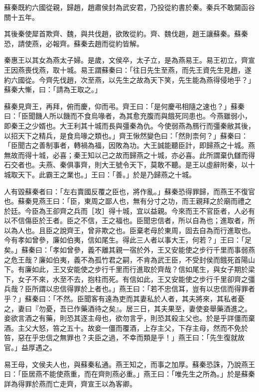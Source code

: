 \begin{pinyinscope}
蘇秦既約六國從親，歸趙，趙肅侯封為武安君，乃投從約書於秦。秦兵不敢闚函谷關十五年。

其後秦使犀首欺齊、魏，與共伐趙，欲敗從約。齊、魏伐趙，趙王讓蘇秦。蘇秦恐，請使燕，必報齊。蘇秦去趙而從約皆解。

秦惠王以其女為燕太子婦。是歲，文侯卒，太子立，是為燕易王。易王初立，齊宣王因燕喪伐燕，取十城。易王謂蘇秦曰：「往日先生至燕，而先王資先生見趙，遂約六國從。今齊先伐趙，次至燕，以先生之故為天下笑，先生能為燕得侵地乎？」蘇秦大慚，曰：「請為王取之。」

蘇秦見齊王，再拜，俯而慶，仰而弔。齊王曰：「是何慶弔相隨之速也？」蘇秦曰：「臣聞饑人所以饑而不食烏喙者，為其愈充腹而與餓死同患也。今燕雖弱小，即秦王之少婿也。大王利其十城而長與彊秦為仇。今使弱燕為鴈行而彊秦敝其後，以招天下之精兵，是食烏喙之類也。」齊王愀然變色曰：「然則柰何？」蘇秦曰：「臣聞古之善制事者，轉禍為福，因敗為功。大王誠能聽臣計，即歸燕之十城。燕無故而得十城，必喜；秦王知以己之故而歸燕之十城，亦必喜。此所謂棄仇讎而得石交者也。夫燕、秦俱事齊，則大王號令天下，莫敢不聽。是王以虛辭附秦，以十城取天下。此霸王之業也。」王曰：「善。」於是乃歸燕之十城。

人有毀蘇秦者曰：「左右賣國反覆之臣也，將作亂。」蘇秦恐得罪歸，而燕王不復官也。蘇秦見燕王曰：「臣，東周之鄙人也，無有分寸之功，而王親拜之於廟而禮之於廷。今臣為王卻齊之兵而［攻］得十城，宜以益親。今來而王不官臣者，人必有以不信傷臣於王者。臣之不信，王之福也。臣聞忠信者，所以自為也；進取者，所以為人也。且臣之說齊王，曾非欺之也。臣棄老母於東周，固去自為而行進取也。今有孝如曾參，廉如伯夷，信如尾生。得此三人者以事大王，何若？」王曰：「足矣。」蘇秦曰：「孝如曾參，義不離其親一宿於外，王又安能使之步行千里而事弱燕之危王哉？廉如伯夷，義不為孤竹君之嗣，不肯為武王臣，不受封侯而餓死首陽山下。有廉如此，王又安能使之步行千里而行進取於齊哉？信如尾生，與女子期於梁下，女子不來，水至不去，抱柱而死。有信如此，王又安能使之步行千里卻齊之彊兵哉？臣所謂以忠信得罪於上者也。」燕王曰：「若不忠信耳，豈有以忠信而得罪者乎？」蘇秦曰：「不然。臣聞客有遠為吏而其妻私於人者，其夫將來，其私者憂之，妻曰『勿憂，吾已作藥酒待之矣』。居三日，其夫果至，妻使妾舉藥酒進之。妾欲言酒之有藥，則恐其逐主母也，欲勿言乎，則恐其殺主父也。於是乎詳僵而棄酒。主父大怒，笞之五十。故妾一僵而覆酒，上存主父，下存主母，然而不免於笞，惡在乎忠信之無罪也？夫臣之過，不幸而類是乎！」燕王曰：「先生復就故官。」益厚遇之。

易王母，文侯夫人也，與蘇秦私通。燕王知之，而事之加厚。蘇秦恐誅，乃說燕王曰：「臣居燕不能使燕重，而在齊則燕必重。」燕王曰：「唯先生之所為。」於是蘇秦詳為得罪於燕而亡走齊，齊宣王以為客卿。


\end{pinyinscope}
